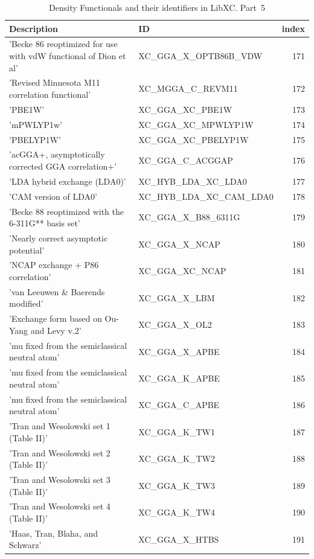 \documentclass[final,12pt]{article}
\begin{document}
{{{{{{\begin{table}[!h]
\caption{Density Functionals and their identifiers in LibXC. Part~5}
\begin{center}
\begin{tabular}{llr}
\hline
\hline
Description & ID & index\\
\hline
  'Becke 86 reoptimized for use with vdW functional of Dion et al' & XC\_GGA\_X\_OPTB86B\_VDW  &171\\
  'Revised Minnesota M11 correlation functional' & XC\_MGGA\_C\_REVM11  &172\\
  'PBE1W' & XC\_GGA\_XC\_PBE1W  &173\\
  'mPWLYP1w' & XC\_GGA\_XC\_MPWLYP1W  &174\\
  'PBELYP1W' & XC\_GGA\_XC\_PBELYP1W  &175\\
  'acGGA+, asymptotically corrected GGA correlation+' & XC\_GGA\_C\_ACGGAP  &176\\
  'LDA hybrid exchange (LDA0)' & XC\_HYB\_LDA\_XC\_LDA0  &177\\
  'CAM version of LDA0' & XC\_HYB\_LDA\_XC\_CAM\_LDA0  &178\\
  'Becke 88 reoptimized with the 6-311G** basis set' & XC\_GGA\_X\_B88\_6311G  &179\\
  'Nearly correct asymptotic potential' & XC\_GGA\_X\_NCAP  &180\\
  'NCAP exchange + P86 correlation' & XC\_GGA\_XC\_NCAP  &181\\
  'van Leeuwen \& Baerends modified' & XC\_GGA\_X\_LBM  &182\\
  'Exchange form based on Ou-Yang and Levy v.2' & XC\_GGA\_X\_OL2  &183\\
  'mu fixed from the semiclassical neutral atom' & XC\_GGA\_X\_APBE  &184\\
  'mu fixed from the semiclassical neutral atom' & XC\_GGA\_K\_APBE  &185\\
  'mu fixed from the semiclassical neutral atom' & XC\_GGA\_C\_APBE  &186\\
  'Tran and Wesolowski set 1 (Table II)' & XC\_GGA\_K\_TW1  &187\\
  'Tran and Wesolowski set 2 (Table II)' & XC\_GGA\_K\_TW2  &188\\
  'Tran and Wesolowski set 3 (Table II)' & XC\_GGA\_K\_TW3  &189\\
  'Tran and Wesolowski set 4 (Table II)' & XC\_GGA\_K\_TW4  &190\\
  'Haas, Tran, Blaha, and Schwarz' & XC\_GGA\_X\_HTBS  &191\\

\end{tabular}
\end{center}
\end{table}}}}}}}
\end{document}
